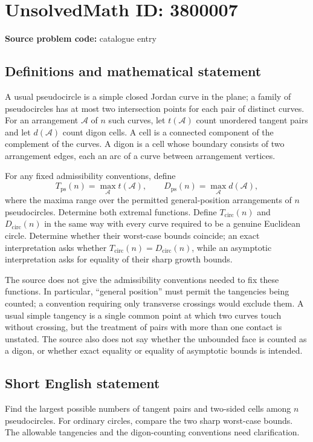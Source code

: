 \documentclass[11pt]{article}
\begin{document}
\section*{UnsolvedMath ID: 3800007}
\textbf{Source problem code:} catalogue entry
\subsection{Definitions and mathematical statement}
A usual pseudocircle is a simple closed Jordan curve in the plane; a family of pseudocircles has at most two intersection points for each pair of distinct curves. For an arrangement $\mathcal A$ of $n$ such curves, let $t(\mathcal A)$ count unordered tangent pairs and let $d(\mathcal A)$ count digon cells. A cell is a connected component of the complement of the curves. A digon is a cell whose boundary consists of two arrangement edges, each an arc of a curve between arrangement vertices.

For any fixed admissibility conventions, define
\[
T_{\mathrm{ps}}(n)=\max_{\mathcal A}t(\mathcal A),\qquad
D_{\mathrm{ps}}(n)=\max_{\mathcal A}d(\mathcal A),
\]
where the maxima range over the permitted general-position arrangements of $n$ pseudocircles. Determine both extremal functions. Define $T_{\mathrm{circ}}(n)$ and $D_{\mathrm{circ}}(n)$ in the same way with every curve required to be a genuine Euclidean circle. Determine whether their worst-case bounds coincide; an exact interpretation asks whether $T_{\mathrm{circ}}(n)=D_{\mathrm{circ}}(n)$, while an asymptotic interpretation asks for equality of their sharp growth bounds.

The source does not give the admissibility conventions needed to fix these functions. In particular, ``general position'' must permit the tangencies being counted; a convention requiring only transverse crossings would exclude them. A usual simple tangency is a single common point at which two curves touch without crossing, but the treatment of pairs with more than one contact is unstated. The source also does not say whether the unbounded face is counted as a digon, or whether exact equality or equality of asymptotic bounds is intended.
\subsection{Short English statement}
Find the largest possible numbers of tangent pairs and two-sided cells among $n$ pseudocircles. For ordinary circles, compare the two sharp worst-case bounds. The allowable tangencies and the digon-counting conventions need clarification.
\end{document}
